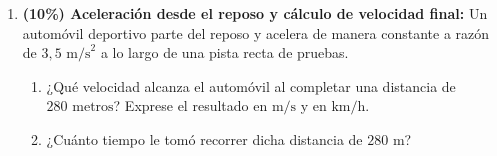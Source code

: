 \documentclass[11pt, letterpaper]{article}
\newif\ifmostrarrespuestas
\newcommand{\respuesta}[1]{
	\ifmostrarrespuestas
	\par\vspace{0.2cm}
	\begin{tcolorbox}[colback=blue!5!white, colframe=valblue, coltext=blue!80!black, boxrule=0.5pt, arc=1mm, left=2mm, right=2mm, top=1.5mm, bottom=1.5mm]
		\footnotesize \textbf{\textcolor{valblue}{Solución Paso a Paso (Docente):}} #1
	\end{tcolorbox}
	\vspace{0.2cm}
	\fi
}
\begin{document}
\begin{enumerate}[leftmargin=*, itemsep=0.6cm]
		\item \textbf{(10\%) Aceleración desde el reposo y cálculo de velocidad final:} Un automóvil deportivo parte del reposo y acelera de manera constante a razón de $3,5\text{ m/s}^2$ a lo largo de una pista recta de pruebas.
		\begin{enumerate}[label=\alph*., itemsep=0.2cm]
			\item ¿Qué velocidad alcanza el automóvil al completar una distancia de $280\text{ metros}$? Exprese el resultado en $\text{m/s}$ y en $\text{km/h}$.
			\item ¿Cuánto tiempo le tomó recorrer dicha distancia de $280\text{ m}$?
		\end{enumerate}
		\respuesta{
			Datos: $v_0 = 0\text{ m/s}$, $a = 3,5\text{ m/s}^2$, $\Delta x = 280\text{ m}$.\\[0.1cm]
			\textbf{a)} Con ec. (2.IV): $v_f^2 = 0^2 + 2(3,5)(280) = 1960 \implies v_f = \sqrt{1960} \approx \mathbf{44,27}\text{ \textbf{m/s}}$.\\
			En $\text{km/h}$: $44,27 \times 3,6 \approx \mathbf{159,38}\text{ \textbf{km/h}}$.\\[0.1cm]
			\textbf{b)} Con ec. (2.II): $t = \frac{v_f - v_0}{a} = \frac{44,27\text{ m/s}}{3,5\text{ m/s}^2} \approx \mathbf{12,65}\text{ \textbf{s}}$.
		}
		
		\newpage
		

\end{enumerate}
\end{document}
